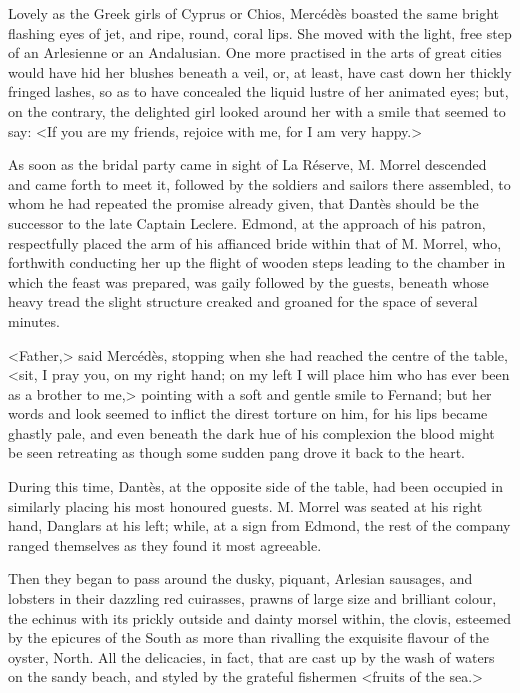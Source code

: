  Lovely as the Greek girls of Cyprus or Chios, Mercédès boasted the same bright flashing eyes of jet, and ripe, round, coral lips. She moved with the light, free step of an Arlesienne or an Andalusian. One more practised in the arts of great cities would have hid her blushes beneath a veil, or, at least, have cast down her thickly fringed lashes, so as to have concealed the liquid lustre of her animated eyes; but, on the contrary, the delighted girl looked around her with a smile that seemed to say: <If you are my friends, rejoice with me, for I am very happy.> 

 As soon as the bridal party came in sight of La Réserve, M. Morrel descended and came forth to meet it, followed by the soldiers and sailors there assembled, to whom he had repeated the promise already given, that Dantès should be the successor to the late Captain Leclere. Edmond, at the approach of his patron, respectfully placed the arm of his affianced bride within that of M. Morrel, who, forthwith conducting her up the flight of wooden steps leading to the chamber in which the feast was prepared, was gaily followed by the guests, beneath whose heavy tread the slight structure creaked and groaned for the space of several minutes. 

 <Father,> said Mercédès, stopping when she had reached the centre of the table, <sit, I pray you, on my right hand; on my left I will place him who has ever been as a brother to me,> pointing with a soft and gentle smile to Fernand; but her words and look seemed to inflict the direst torture on him, for his lips became ghastly pale, and even beneath the dark hue of his complexion the blood might be seen retreating as though some sudden pang drove it back to the heart. 

 During this time, Dantès, at the opposite side of the table, had been occupied in similarly placing his most honoured guests. M. Morrel was seated at his right hand, Danglars at his left; while, at a sign from Edmond, the rest of the company ranged themselves as they found it most agreeable. 

 Then they began to pass around the dusky, piquant, Arlesian sausages, and lobsters in their dazzling red cuirasses, prawns of large size and brilliant colour, the echinus with its prickly outside and dainty morsel within, the clovis, esteemed by the epicures of the South as more than rivalling the exquisite flavour of the oyster, North. All the delicacies, in fact, that are cast up by the wash of waters on the sandy beach, and styled by the grateful fishermen <fruits of the sea.> 

